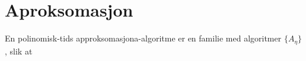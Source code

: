 \section{Aproksomasjon}
En polinomisk-tids approksomasjona-algoritme er en familie med algoritmer $ \{ A_{\eta} \}$, slik at